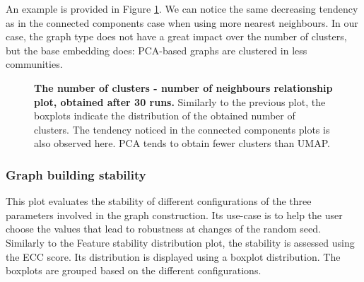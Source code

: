 An example is provided in Figure \ref{fig:ca-nn-k}. We can notice the same decreasing tendency as in the connected components case when using more nearest neighbours. In our case, the graph type does not have a great impact over the number of clusters, but the base embedding does: PCA-based graphs are clustered in less communities.

\begin{figure}[H]
    \centering
    \caption{\label{fig:ca-nn-k}\textbf{The number of clusters - number of neighbours relationship plot, obtained after 30 runs.} Similarly to the previous plot, the boxplots indicate the distribution of the obtained number of clusters. The tendency noticed in the connected components plots is also observed here. PCA tends to obtain fewer clusters than UMAP. }
\end{figure}

\subsubsection{Graph building stability}
This plot evaluates the stability of different configurations of the three parameters involved in the graph construction. Its use-case is to help the user choose the values that lead to robustness at changes of the random seed. Similarly to the Feature stability distribution plot, the stability is assessed using the ECC score. Its distribution is displayed using a boxplot distribution. The boxplots are grouped based on the different configurations.

